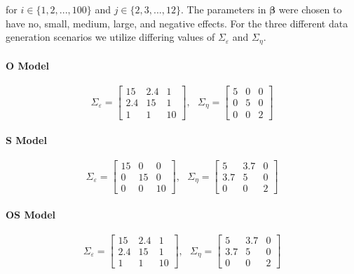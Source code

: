 \documentclass[
]{article}
\begin{document}
for \(i \in \{1, 2, ..., 100\}\) and \(j \in \{2, 3,..., 12\}\). The parameters in \(\boldsymbol{\beta}\) were chosen to have no, small, medium, large, and negative effects. For the three different data generation scenarios we utilize differing values of \(\Sigma_\varepsilon\) and \(\Sigma_\eta\).

\hypertarget{o-model}{%
\paragraph{O Model}\label{o-model}}

\begin{equation*}
\Sigma_\varepsilon = 
\begin{bmatrix}
15 & 2.4 & 1\\
2.4 & 15 & 1\\
1 & 1 & 10
\end{bmatrix}, \ \ \ 
\Sigma_\eta =
\begin{bmatrix}
5 & 0 & 0\\
0 & 5 & 0\\
0 & 0 & 2
\end{bmatrix}
\end{equation*}

\hypertarget{s-model}{%
\paragraph{S Model}\label{s-model}}

\begin{equation*}
\Sigma_\varepsilon = 
\begin{bmatrix}
15 & 0 & 0\\
0 & 15 & 0\\
0 & 0 & 10
\end{bmatrix}, \ \ \ 
\Sigma_\eta =
\begin{bmatrix}
5 & 3.7 & 0\\
3.7 & 5 & 0\\
0 & 0 & 2
\end{bmatrix}
\end{equation*}

\hypertarget{os-model}{%
\paragraph{OS Model}\label{os-model}}

\begin{equation*}
\Sigma_\varepsilon = 
\begin{bmatrix}
15 & 2.4 & 1\\
2.4 & 15 & 1\\
1 & 1 & 10
\end{bmatrix}, \ \ \ 
\Sigma_\eta =
\begin{bmatrix}
5 & 3.7 & 0\\
3.7 & 5 & 0\\
0 & 0 & 2
\end{bmatrix}
\end{equation*}
\end{document}
